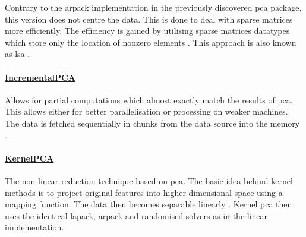 Contrary to the \acrshort{arpack} implementation in the previously discovered \gls{pca} package, this version does not centre the data.
This is done to deal with sparse matrices more efficiently.
The efficiency is gained by utilising sparse matrices datatypes which store only the location of nonzero elements \cite{HandsOnMLCh1}.
This approach is also known as \gls{lsa} \cite{scikit-learn}.


\paragraph{\href{https://scikit-learn.org/stable/modules/generated/sklearn.decomposition.IncrementalPCA.html\#sklearn.decomposition.IncrementalPCA}{%
%
IncrementalPCA%
}}

Allows for partial computations which almost exactly match the results of \gls{pca}.
This allows either for better parallelisation or processing on weaker machines.
The data is fetched sequentially in chunks from the data source into the memory \cite{scikit-learn}.


\paragraph{\href{https://scikit-learn.org/stable/modules/generated/sklearn.decomposition.KernelPCA.html\#sklearn.decomposition.KernelPCA}{%
%
KernelPCA%
}}

The non-linear reduction technique based on \gls{pca}.
The basic idea behind kernel methods is to project original features into higher-dimensional space using a mapping function.
The data then becomes separable linearly \cite{PythonMachineLearningCh1}.
Kernel \gls{pca} then uses the identical \acrshort{lapack}, \acrshort{arpack} and randomised solvers as in the linear implementation.


\clearpage
